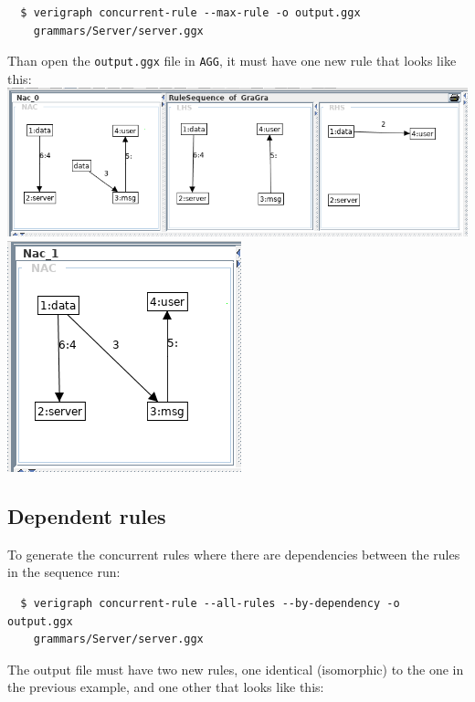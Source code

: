 \documentclass[12pt]{article}
\begin{document}
\begin{verbatim}
  $ verigraph concurrent-rule --max-rule -o output.ggx 
    grammars/Server/server.ggx
\end{verbatim}

Than open the \texttt{output.ggx} file in \texttt{AGG}, it must have one new rule that looks like this:\\

\noindent
\includegraphics[scale = 0.6]{rule-sequence_04a.png}\\
\noindent
\includegraphics[scale = 0.6]{rule-sequence_04b.png}\\

\subsection{Dependent rules}

To generate the concurrent rules where there are dependencies between the rules in the sequence run:

\begin{verbatim}
  $ verigraph concurrent-rule --all-rules --by-dependency -o output.ggx 
    grammars/Server/server.ggx
\end{verbatim}

The output file must have two new rules, one identical (isomorphic) to the one in the previous example, and one other that looks like this:\\
\end{document}
